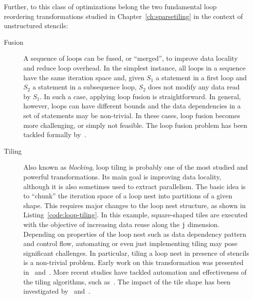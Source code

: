 Further, to this class of optimizations belong the two fundamental loop reordering transformations studied in Chapter~\ref{ch:sparsetiling} in the context of unstructured stencils:
\begin{description}
\item[Fusion] A sequence of loops can be fused, or ``merged'', to improve data locality and reduce loop overhead. In the simplest instance, all loops in a sequence have the same iteration space and, given $S_1$ a statement in a first loop and $S_2$ a statement in a subsequence loop, $S_2$ does not modify any data read by $S_1$. In such a case, applying loop fusion is straightforward. In general, however, loops can have different bounds and the data dependencies in a set of statements may be non-trivial. In these cases, loop fusion becomes more challenging, or simply not feasible. The loop fusion problem has been tackled formally by~\cite{fusion-complexity}.
\item[Tiling] Also known as {\em blocking}, loop tiling is probably one of the most studied and powerful transformations. Its main goal is improving data locality, although it is also sometimes used to extract parallelism. The basic idea is to ``chunk'' the iteration space of a loop nest into partitions of a given shape. This requires major changes to the loop nest structure, as shown in Listing~\ref{code:loop-tiling}. In this example, square-shaped tiles are executed with the objective of increasing data reuse along the \texttt{j} dimension. Depending on properties of the loop nest such as data dependency pattern and control flow, automating or even just implementing tiling may pose significant challenges. In particular, tiling a loop nest in presence of stencils is a non-trivial problem. Early work on this transformation was presented in~\cite{early-tile-cite-1} and~\cite{early-tile-cite-2}. More recent studies have tackled automation and effectiveness of the tiling algorithms, such as~\cite{pluto,plutoplus,loopy-final}. The impact of the tile shape has been investigated by~\cite{tile-shape-1} and~\cite{tile-shape-2}. 
\end{description}


